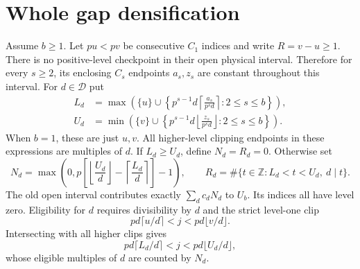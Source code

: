 \documentclass[11pt,letterpaper]{article}
\theoremstyle{definition}\newtheorem{definition}{Definition}
\newcommand{\D}{\mathcal D}
\begin{document}
\section{Whole gap densification}\label{sec:dense}
Assume $b\ge1$. Let $pu<pv$ be consecutive $C_1$ indices and write $R=v-u\ge1$. There is no positive-level checkpoint in their open physical interval. Therefore for every $s\ge2$, its enclosing $C_s$ endpoints $a_s,z_s$ are constant throughout this interval. For $d\in\D$ put
\begin{align}
L_d&=\max\left(\{u\}\cup\left\{p^{s-1}d\left\lceil\frac{a_s}{p^sd}\right\rceil:2\le s\le b\right\}\right),\label{eq:L}\\
U_d&=\min\left(\{v\}\cup\left\{p^{s-1}d\left\lfloor\frac{z_s}{p^sd}\right\rfloor:2\le s\le b\right\}\right).\label{eq:U}
\end{align}
When $b=1$, these are just $u,v$. All higher-level clipping endpoints in these expressions are multiples of $d$. If $L_d\ge U_d$, define $N_d=R_d=0$. Otherwise set
\begin{equation}
N_d=\max\left(0,p\left[\left\lfloor\frac{U_d}{d}\right\rfloor-
\left\lceil\frac{L_d}{d}\right\rceil\right]-1\right),
\qquad R_d=\#\{t\in\mathbb Z:L_d<t<U_d,\ d\mid t\}.\label{eq:NR}
\end{equation}
The old open interval contributes exactly $\sum_d c_dN_d$ to $U_b$. Its indices all have level zero. Eligibility for $d$ requires divisibility by $d$ and the strict level-one clip
\[
pd\lceil u/d\rceil<j<pd\lfloor v/d\rfloor.
\]
Intersecting with all higher clips gives
\[
pd\lceil L_d/d\rceil<j<pd\lfloor U_d/d\rfloor,
\]
whose eligible multiples of $d$ are counted by $N_d$.
\end{document}
